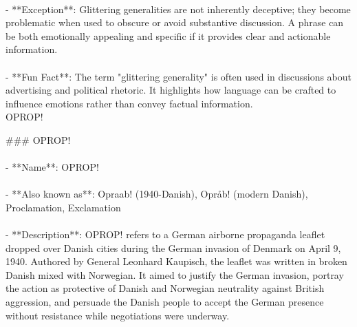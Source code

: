 \documentclass[a4paper,12pt,single,pdftex]{scrartcl}
\begin{document}
    
      
    \\

    
      - **Exception**: Glittering generalities are not inherently deceptive; they become problematic when used to obscure or avoid substantive discussion. A phrase can be both emotionally appealing and specific if it provides clear and actionable information.
    \\

    
      
    \\

    
      - **Fun Fact**: The term "glittering generality" is often used in discussions about advertising and political rhetoric. It highlights how language can be crafted to influence emotions rather than convey factual information.
    \\

  

OPROP!
    
      \#\#\# OPROP!
    \\

    
      
    \\

    
      - **Name**: OPROP!
    \\

    
      
    \\

    
      - **Also known as**: Opraab! (1940-Danish), Opråb! (modern Danish), Proclamation, Exclamation
    \\

    
      
    \\

    
      - **Description**: OPROP! refers to a German airborne propaganda leaflet dropped over Danish cities during the German invasion of Denmark on April 9, 1940. Authored by General Leonhard Kaupisch, the leaflet was written in broken Danish mixed with Norwegian. It aimed to justify the German invasion, portray the action as protective of Danish and Norwegian neutrality against British aggression, and persuade the Danish people to accept the German presence without resistance while negotiations were underway.
    \\

    
      
    \\
\end{document}
